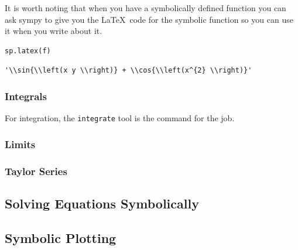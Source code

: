 \begin{example}
    It is worth noting that when you have a symbolically defined function you can ask
    sympy to give you the \LaTeX\ code for the symbolic function so you can use it when you write about it.

\bcode
\begin{lstlisting}
sp.latex(f)
\end{lstlisting}
\boutput
\begin{lstlisting}
'\\sin{\\left(x y \\right)} + \\cos{\\left(x^{2} \\right)}'
\end{lstlisting}
\end{example}

\subsubsection{Integrals}
For integration, the \texttt{integrate} tool is the command for the job.

\subsubsection{Limits}

\subsubsection{Taylor Series}

\subsection{Solving Equations Symbolically}

\subsection{Symbolic Plotting}




